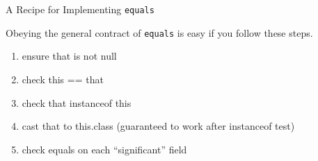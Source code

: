 \documentclass{beamer}
\begin{document}
\begin{frame}[fragile]{A Recipe for Implementing {\tt equals}}


Obeying the general contract of {\tt equals} is easy if you follow these steps.\\

\begin{enumerate}
\item ensure that is not null
\item check this == that
\item check that instanceof this
\item cast that to this.class (guaranteed to work after instanceof test)
\item check equals on each ``significant'' field
\end{enumerate}


\end{frame}










\end{document}

